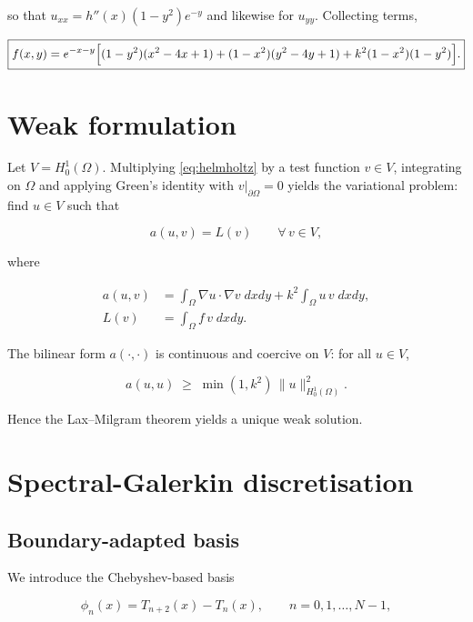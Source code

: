 \documentclass[11pt,a4paper,twoside,pdf]{article}
\numberwithin{equation}{section}
\begin{document}
so that $u_{xx} = h''(x)(1-y^{2})e^{-y}$ and likewise for $u_{yy}$.
Collecting terms,

\begin{equation}
\label{eq:fsource}
\boxed{
f(x,y) = e^{-x-y}
\Bigl[
(1-y^{2})(x^{2} - 4x + 1)
+ (1-x^{2})(y^{2} - 4y + 1)
+ k^{2}(1-x^{2})(1-y^{2})
\Bigr].
}
\end{equation}

\section{Weak formulation}
\label{sec:weak}

Let $V = H^{1}_{0}(\Omega)$. Multiplying \eqref{eq:helmholtz} by a
test function $v \in V$, integrating on $\Omega$ and applying Green's
identity with $v|_{\partial\Omega} = 0$ yields the variational
problem: find $u \in V$ such that

\begin{equation}
\label{eq:weak}
a(u,v) = L(v) \qquad \forall\, v \in V,
\end{equation}

where

\begin{align}
a(u,v) &=
\int_{\Omega} \nabla u \cdot \nabla v \; dxdy
+ k^{2} \int_{\Omega} u \, v \; dxdy,
\\[4pt]
L(v) &= \int_{\Omega} f \, v \; dxdy.
\end{align}

The bilinear form $a(\cdot,\cdot)$ is continuous and coercive on $V$:
for all $u \in V$,

\[
a(u,u) \;\geq\; \min(1, k^{2})\, \|u\|_{H^{1}_{0}(\Omega)}^{2}.
\]

Hence the Lax--Milgram theorem \cite{ern2004theory} yields a unique
weak solution.

\section{Spectral-Galerkin discretisation}
\label{sec:galerkin}

\subsection{Boundary-adapted basis}

We introduce the Chebyshev-based basis

\begin{equation}
\phi_{n}(x) = T_{n+2}(x) - T_{n}(x),
\qquad n = 0, 1, \dots, N-1,
\end{equation}
\end{document}
